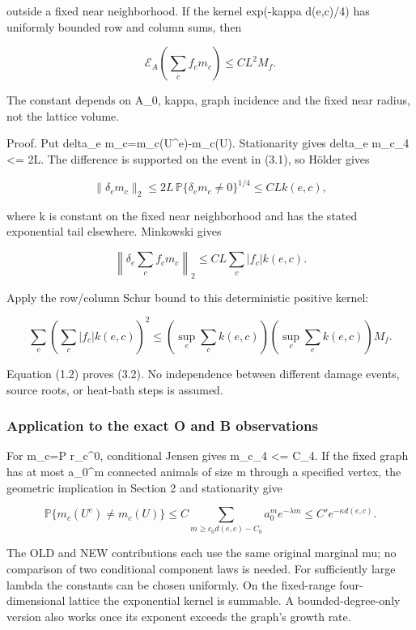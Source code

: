 \documentclass[
  11pt,
]{article}
\begin{document}
outside a fixed near neighborhood. If the kernel exp(-kappa d(e,c)/4)
has uniformly bounded row and column sums, then

\[
 \boxed{\quad
 \mathcal E_A\left(\sum_c f_c m_c\right)
 \le C L^2 M_f.
 \quad}
 \tag{3.2}
\]

The constant depends on A\_0, kappa, graph incidence and the fixed near
radius, not the lattice volume.

Proof. Put delta\_e m\_c=m\_c(U\^{}e)-m\_c(U). Stationarity gives
\textbar\textbar delta\_e m\_c\textbar\textbar\_4 \textless= 2L. The
difference is supported on the event in (3.1), so Hölder gives

\[
 \|\delta_e m_c\|_2
 \le 2L\,\mathbb P\{\delta_e m_c\ne0\}^{1/4}
 \le C L k(e,c),
 \tag{3.3}
\]

where k is constant on the fixed near neighborhood and has the stated
exponential tail elsewhere. Minkowski gives

\[
 \left\|\delta_e\sum_c f_cm_c\right\|_2
 \le C L\sum_c |f_c|k(e,c).
 \tag{3.4}
\]

Apply the row/column Schur bound to this deterministic positive kernel:

\[
 \sum_e\left(\sum_c|f_c|k(e,c)\right)^2
 \le\left(\sup_e\sum_ck(e,c)\right)
      \left(\sup_c\sum_ek(e,c)\right)M_f.
 \tag{3.5}
\]

Equation (1.2) proves (3.2). No independence between different damage
events, source roots, or heat-bath steps is assumed.

\hypertarget{application-to-the-exact-o-and-b-observations}{%
\subsubsection{Application to the exact O and B
observations}\label{application-to-the-exact-o-and-b-observations}}

For m\_c=P r\_c\^{}0, conditional Jensen gives
\textbar\textbar m\_c\textbar\textbar\_4 \textless= C\_4. If the fixed
graph has at most a\_0\^{}m connected animals of size m through a
specified vertex, the geometric implication in Section 2 and
stationarity give

\[
 \mathbb P\{m_c(U^e)\ne m_c(U)\}
 \le C\sum_{m\ge c_0d(e,c)-C_0}a_0^m e^{-\lambda m}
 \le C'e^{-\kappa d(e,c)}.
 \tag{3.6}
\]

The OLD and NEW contributions each use the same original marginal mu; no
comparison of two conditional component laws is needed. For sufficiently
large lambda the constants can be chosen uniformly. On the fixed-range
four-dimensional lattice the exponential kernel is summable. A
bounded-degree-only version also works once its exponent exceeds the
graph's growth rate.
\end{document}
